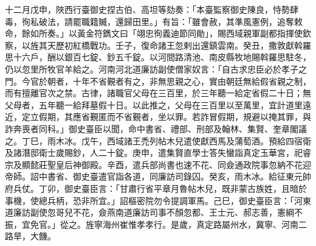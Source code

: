 \begin{pinyinscope}
 十二月戊申，陜西行臺御史捏古伯、高坦等劾奏：「本臺監察御史陳良，恃勢肆毒，徇私破法，請罷職籍贓，還歸田里。」有旨：「雖會赦，其準風憲例，追奪敕命，餘如所奏。」以黃金符鐫文曰「翊忠徇義迪節同勛」，賜西域親軍副都指揮使欽察，以旌其天歷初紅橋戰功。壬子，復命諸王忽剌出還鎮雲南。癸丑，撒敦獻斡羅思十六戶，酬以銀百七錠、鈔五千錠。以河間路清池、南皮縣牧地賜斡羅思駐冬，仍以忽里所牧官羊給之。河南河北道廉訪副使僧家奴言：「自古求忠臣必於孝子之門。今官於朝者，十年不省覲者有之，非無思親之心，實由朝廷無給假省親之制，而有擅離官次之禁。古律，諸職官父母在三百里，於三年聽一給定省假二十日；無父母者，五年聽一給拜墓假十日。以此推之，父母在三百里以至萬里，宜計道里遠近，定立假期，其應省覲匿而不省覲者，坐以罪。若詐冒假期，規避以掩其罪，與詐奔喪者同科。」御史臺臣以聞，命中書省、禮部、刑部及翰林、集賢、奎章閣議之。丁巳，雨木冰。戊午，西域諸王禿列帖木兒遣使獻西馬及蒲萄酒。預給四宿衛及諸潛邸衛士歲賜鈔，人二十錠。庚申，遣集賢直學士答失蠻詣真定玉華宮，祀睿宗及顯懿莊聖皇后神御殿。辛酉，遣兵部尚書也速不花、同僉通政院事忽納不花迎帝師。詔中書省、御史臺遣官詣各道，同廉訪司錄囚。癸亥，雨木冰。給征東元帥府兵仗。丁卯，御史臺臣言：「甘肅行省平章月魯帖木兒，既非蒙古族姓，且暗於事機，使總兵柄，恐非所宜。」詔樞密院勿令提調軍馬。己巳，御史臺臣言：「河東道廉訪副使忽哥兒不花，僉燕南道廉訪司事不顏忽都、王士元、郝志善，憲綱不振，宜免官。」從之。旌寧海州崔惟孝孝行。是歲，真定路屬州水，冀寧、河南二路旱，大饑。



\end{pinyinscope}
